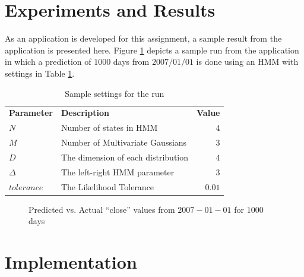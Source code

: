 \documentclass{acm_proc_article-sp}
\newcommand{\thickhline}{\noalign{\hrule height 1.0pt}}
\begin{document}
\section{Experiments and Results} \label{sec:results}
As an application is developed for this assignment, a sample result from the application is presented here. Figure
\ref{fig:res1} depicts a sample run from the application in which a prediction of $1000$ days from $2007/01/01$ is done using
an HMM with settings in Table \ref{tbl:res1}.

\begin{table}[h]
\centering
\begin{tabular}{l l r}  
\textbf{Parameter} & \textbf{Description} & \textbf{Value} \\ \thickhline
$N$ & Number of states in HMM & $4$ \\ \hline
$M$ & Number of Multivariate Gaussians & $3$ \\ \hline
$D$ & The dimension of each distribution & $4$ \\ \hline
$\Delta$ & The left-right HMM parameter & $3$ \\ \hline
$tolerance$ & The Likelihood Tolerance & $0.01$ \\ \hline
\end{tabular}
\caption{Sample settings for the run} \label{tbl:res1}
\end{table}

\begin{figure}[t] 
\centering
\setlength\fboxsep{0.1pt}
\setlength\fboxrule{0.7pt}
\caption{Predicted vs. Actual ``close'' values from $2007-01-01$ for $1000$ days} \label{fig:res1}
\end{figure}

\section{Implementation} \label{sec:impl}
\end{document}
